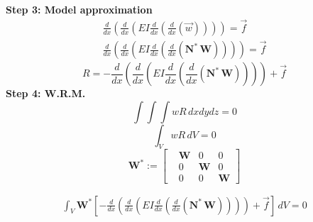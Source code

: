 \documentclass{article}
\begin{document}
\textbf{Step 3: Model approximation}
\\
\begin{align}
   \frac{d}{dx}\left(\frac{d}{dx}\left(EI\frac{d}{dx}\left(\frac{d}{dx}\left(\vec{w}\right)\right)\right)\right)=\vec{f}\\
    \frac{d}{dx}\left(\frac{d}{dx}\left(EI\frac{d}{dx}\left(\frac{d}{dx}\left( \mathbf{N}^*\,\mathbf{W}\right)\right)\right)\right)=\vec{f}
\end{align}
\begin{equation}
    R=-\frac{d}{dx}\left(\frac{d}{dx}\left(EI\frac{d}{dx}\left(\frac{d}{dx}\left( \mathbf{N}^*\,\mathbf{W}\right)\right)\right)\right)+\vec{f}
\end{equation}
\vspace{10mm} %
\textbf{Step 4: W.R.M.}
\begin{equation}
    \int \int \int wR\,dxdydz=0
\end{equation}
\begin{equation}
    \int_VwR\,dV=0
\end{equation}
\begin{equation}
    \mathbf{W}^*:=
    \begin{bmatrix}
    &\mathbf{W} &0 &0\\
    &0 &\mathbf{W} &0\\
    &0 &0 &\mathbf{W}
    \end{bmatrix}
\end{equation}


\begin{align}
    \int_V
    \mathbf{W}^*
    \left [
    -\frac{d}{dx}\left(\frac{d}{dx}\left(EI\frac{d}{dx}\left(\frac{d}{dx}\left( \mathbf{N}^*\,\mathbf{W}\right)\right)\right)\right)+\vec{f}
    \right ]\,dV=0
\end{align}
\newpage    %
\end{document}
